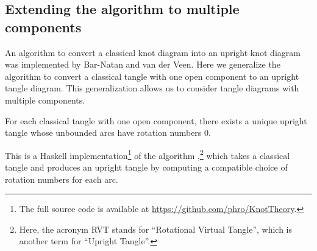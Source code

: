\subsection{Extending the algorithm to multiple components}

An algorithm to convert a classical knot diagram into an upright knot diagram
was implemented by Bar-Natan and van der Veen. Here we generalize the algorithm
to convert a classical tangle with one open component to an upright tangle
diagram. This generalization allows us to consider tangle diagrams with multiple
components.

\begin{lemma}
        For each classical tangle with one open component, there exists a unique
        upright tangle whose unbounded arcs have rotation numbers $0$.
\end{lemma}

This is a Haskell implementation\footnote{The full source code is available at
\url{https://github.com/phro/KnotTheory}.} of the algorithm ,\footnote{Here, the
acronym RVT stands for \enquote{Rotational Virtual Tangle}, which is
another term for \enquote{Upright Tangle}.} which takes a classical tangle and
produces an upright tangle by computing a compatible choice of rotation numbers
for each arc.


